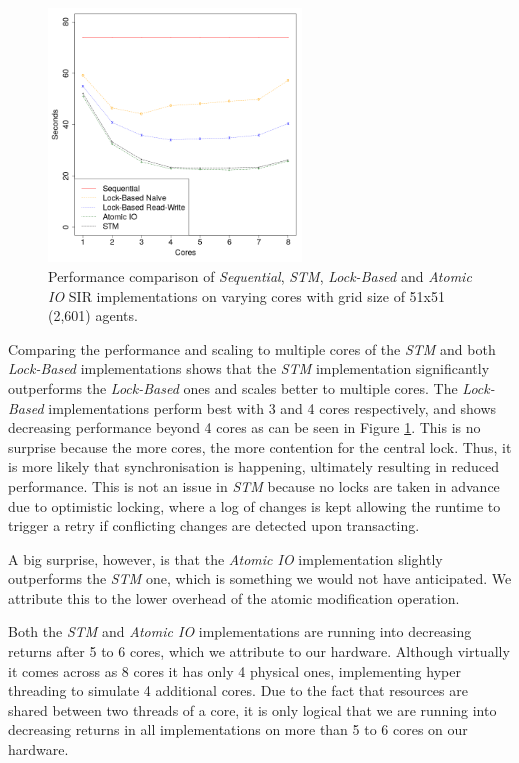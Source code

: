 \begin{figure}
	\centering
	\includegraphics[width=0.6\textwidth, angle=0]{./fig/concurrentabs/sir/sir_varyingcores_constgrid.png}
	\caption{Performance comparison of \textit{Sequential}, \textit{STM}, \textit{Lock-Based} and \textit{Atomic IO} SIR implementations on varying cores with grid size of 51x51 (2,601) agents.}
	\label{fig:sir_varyingcores_constgrid}
\end{figure}

Comparing the performance and scaling to multiple cores of the \textit{STM} and both \textit{Lock-Based} implementations shows that the \textit{STM} implementation significantly outperforms the \textit{Lock-Based} ones and scales better to multiple cores. The \textit{Lock-Based} implementations perform best with 3 and 4 cores respectively, and shows decreasing performance beyond 4 cores as can be seen in Figure \ref{fig:sir_varyingcores_constgrid}. This is no surprise because the more cores, the more contention for the central lock. Thus, it is more likely that synchronisation is happening, ultimately resulting in reduced performance. This is not an issue in \textit{STM} because no locks are taken in advance due to optimistic locking, where a log of changes is kept allowing the runtime to trigger a retry if conflicting changes are detected upon transacting. 

A big surprise, however, is that the \textit{Atomic IO} implementation slightly outperforms the \textit{STM} one, which is something we would not have anticipated. We attribute this to the lower overhead of the atomic modification operation.

Both the \textit{STM} and \textit{Atomic IO} implementations are running into decreasing returns after 5 to 6 cores, which we attribute to our hardware. Although virtually it comes across as 8 cores it has only 4 physical ones, implementing hyper threading to simulate 4 additional cores. Due to the fact that resources are shared between two threads of a core, it is only logical that we are running into decreasing returns in all implementations on more than 5 to 6 cores on our hardware.

